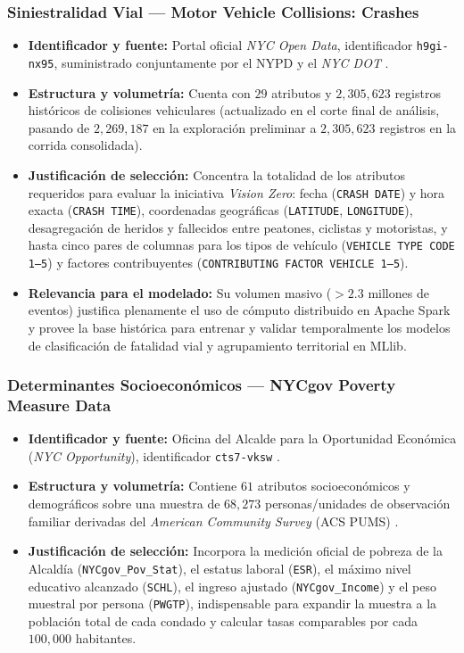 \subsubsection{Siniestralidad Vial --- Motor Vehicle Collisions: Crashes}
\begin{itemize}
    \item \textbf{Identificador y fuente:} Portal oficial \textit{NYC Open Data}, identificador \texttt{h9gi-nx95}, suministrado conjuntamente por el NYPD y el \textit{NYC DOT} \cite{nyc_collisions_crashes_2026}.
    \item \textbf{Estructura y volumetría:} Cuenta con $29$ atributos y $2,305,623$ registros históricos de colisiones vehiculares (actualizado en el corte final de análisis, pasando de $2,269,187$ en la exploración preliminar a $2,305,623$ registros en la corrida consolidada).
    \item \textbf{Justificación de selección:} Concentra la totalidad de los atributos requeridos para evaluar la iniciativa \textit{Vision Zero}: fecha (\texttt{CRASH DATE}) y hora exacta (\texttt{CRASH TIME}), coordenadas geográficas (\texttt{LATITUDE}, \texttt{LONGITUDE}), desagregación de heridos y fallecidos entre peatones, ciclistas y motoristas, y hasta cinco pares de columnas para los tipos de vehículo (\texttt{VEHICLE TYPE CODE 1--5}) y factores contribuyentes (\texttt{CONTRIBUTING FACTOR VEHICLE 1--5}).
    \item \textbf{Relevancia para el modelado:} Su volumen masivo ($>2.3$ millones de eventos) justifica plenamente el uso de cómputo distribuido en Apache Spark y provee la base histórica para entrenar y validar temporalmente los modelos de clasificación de fatalidad vial y agrupamiento territorial en MLlib.
\end{itemize}

\subsubsection{Determinantes Socioeconómicos --- NYCgov Poverty Measure Data}
\begin{itemize}
    \item \textbf{Identificador y fuente:} Oficina del Alcalde para la Oportunidad Económica (\textit{NYC Opportunity}), identificador \texttt{cts7-vksw} \cite{nyc_poverty_data_2018}.
    \item \textbf{Estructura y volumetría:} Contiene $61$ atributos socioeconómicos y demográficos sobre una muestra de $68,273$ personas/unidades de observación familiar derivadas del \textit{American Community Survey} (ACS PUMS) \cite{acs_pums_dict_2018}.
    \item \textbf{Justificación de selección:} Incorpora la medición oficial de pobreza de la Alcaldía (\texttt{NYCgov\_Pov\_Stat}), el estatus laboral (\texttt{ESR}), el máximo nivel educativo alcanzado (\texttt{SCHL}), el ingreso ajustado (\texttt{NYCgov\_Income}) y el peso muestral por persona (\texttt{PWGTP}), indispensable para expandir la muestra a la población total de cada condado y calcular tasas comparables por cada $100,000$ habitantes.
\end{itemize}

